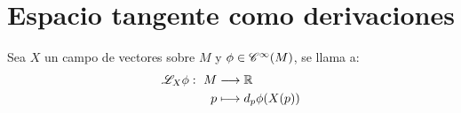 \section{Espacio tangente como derivaciones}\label{sec:espacio-tangente-como-derivaciones}

\begin{definition}
  Sea $X$ un campo de vectores sobre $M$ y $\phi\in\mathscr{C}^\infty(M)$, se llama  a:
  \begin{equation}
    \label{eq:derivada-lie-funcion-campo}
    \begin{alignedat}{1}
      \mathscr{L}_X \phi:\ M & \longrightarrow \mathbb{R} \\ p & \longmapsto d_p \phi(X(p))
    \end{alignedat}
  \end{equation}
\end{definition}

